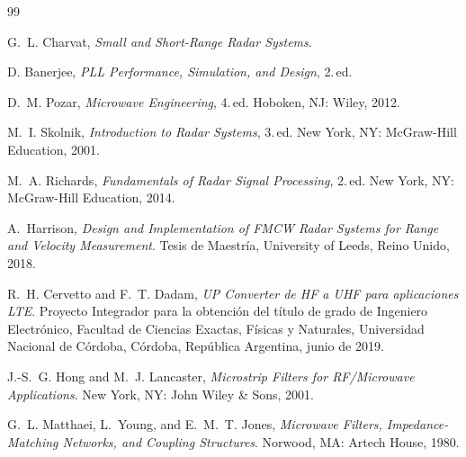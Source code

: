 \renewcommand{\bibname}{Bibliografía}
\begin{thebibliography}{99}
\setlength{\itemsep}{0.25em}
\setlength{\parskip}{0pt}
\setlength{\parsep}{0pt}

G.~L. Charvat, \emph{Small and Short-Range Radar Systems}.

D. Banerjee, \emph{PLL Performance, Simulation, and Design}, 2.\,ed.

D.~M. Pozar, \emph{Microwave Engineering}, 4.\,ed. Hoboken, NJ: Wiley, 2012.

M.~I. Skolnik, \emph{Introduction to Radar Systems}, 3.\,ed. New York, NY: McGraw-Hill Education, 2001.

M.~A. Richards, \emph{Fundamentals of Radar Signal Processing}, 2.\,ed. New York, NY: McGraw-Hill Education, 2014.

A.~Harrison, \emph{Design and Implementation of FMCW Radar Systems for Range and Velocity Measurement}.
Tesis de Maestría, University of Leeds, Reino Unido, 2018.

R.~H. Cervetto and F.~T. Dadam,
\emph{UP Converter de HF a UHF para aplicaciones LTE}.
Proyecto Integrador para la obtención del título de grado de Ingeniero Electrónico,
Facultad de Ciencias Exactas, Físicas y Naturales,
Universidad Nacional de Córdoba,
Córdoba, República Argentina, junio de 2019.

J.-S.~G. Hong and M.~J. Lancaster,
\emph{Microstrip Filters for RF/Microwave Applications}.
New York, NY: John Wiley \& Sons, 2001.

G.~L. Matthaei, L.~Young, and E.~M.~T. Jones,
\emph{Microwave Filters, Impedance-Matching Networks, and Coupling Structures}.
Norwood, MA: Artech House, 1980.

\end{thebibliography}
